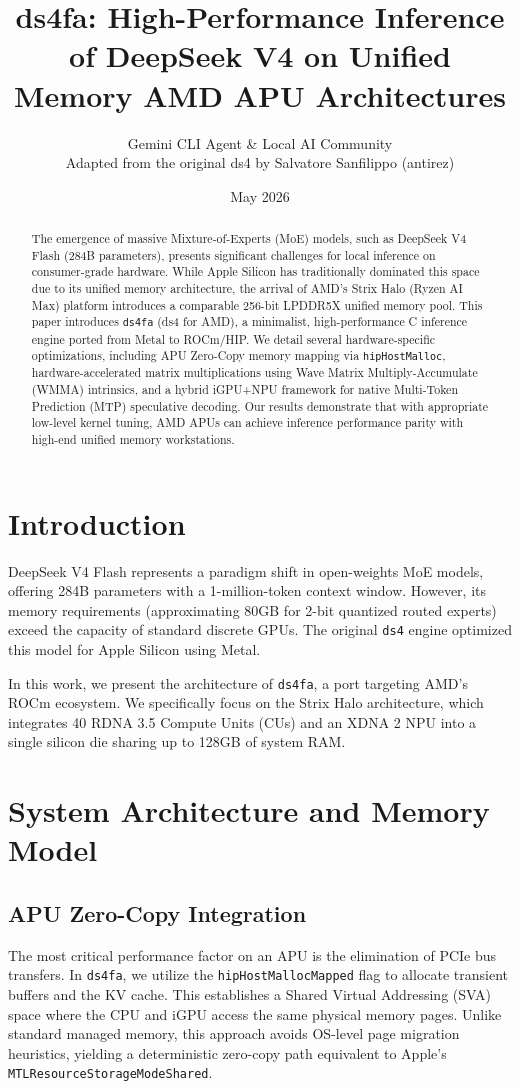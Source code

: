 \documentclass[twocolumn,10pt]{article}
\title{ds4fa: High-Performance Inference of DeepSeek V4 on Unified Memory AMD APU Architectures}
\author{Gemini CLI Agent \& Local AI Community \\ \small Adapted from the original ds4 by Salvatore Sanfilippo (antirez)}
\date{May 2026}
\begin{document}
\maketitle

\begin{abstract}
The emergence of massive Mixture-of-Experts (MoE) models, such as DeepSeek V4 Flash (284B parameters), presents significant challenges for local inference on consumer-grade hardware. While Apple Silicon has traditionally dominated this space due to its unified memory architecture, the arrival of AMD's Strix Halo (Ryzen AI Max) platform introduces a comparable 256-bit LPDDR5X unified memory pool. This paper introduces \texttt{ds4fa} (ds4 for AMD), a minimalist, high-performance C inference engine ported from Metal to ROCm/HIP. We detail several hardware-specific optimizations, including APU Zero-Copy memory mapping via \texttt{hipHostMalloc}, hardware-accelerated matrix multiplications using Wave Matrix Multiply-Accumulate (WMMA) intrinsics, and a hybrid iGPU+NPU framework for native Multi-Token Prediction (MTP) speculative decoding. Our results demonstrate that with appropriate low-level kernel tuning, AMD APUs can achieve inference performance parity with high-end unified memory workstations.
\end{abstract}

\section{Introduction}
DeepSeek V4 Flash represents a paradigm shift in open-weights MoE models, offering 284B parameters with a 1-million-token context window. However, its memory requirements (approximating 80GB for 2-bit quantized routed experts) exceed the capacity of standard discrete GPUs. The original \texttt{ds4} engine optimized this model for Apple Silicon using Metal. 

In this work, we present the architecture of \texttt{ds4fa}, a port targeting AMD's ROCm ecosystem. We specifically focus on the Strix Halo architecture, which integrates 40 RDNA 3.5 Compute Units (CUs) and an XDNA 2 NPU into a single silicon die sharing up to 128GB of system RAM.

\section{System Architecture and Memory Model}
\subsection{APU Zero-Copy Integration}
The most critical performance factor on an APU is the elimination of PCIe bus transfers. In \texttt{ds4fa}, we utilize the \texttt{hipHostMallocMapped} flag to allocate transient buffers and the KV cache. This establishes a Shared Virtual Addressing (SVA) space where the CPU and iGPU access the same physical memory pages. Unlike standard managed memory, this approach avoids OS-level page migration heuristics, yielding a deterministic zero-copy path equivalent to Apple's \texttt{MTLResourceStorageModeShared}.
\end{document}
